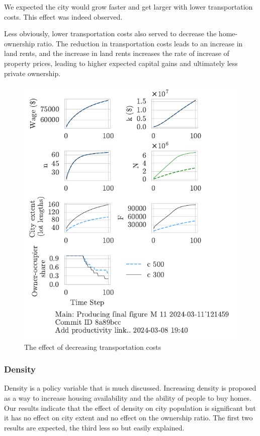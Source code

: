 We expected the city would grow faster and get larger with lower transportation costs. This effect was indeed observed. 

Less obviously, lower transportation costs also served to decrease the home-ownership ratio. The reduction in transportation costs leads to an increase in land rents, and the increase in land rents increases the rate of increase of property prices, leading to higher expected capital gains and ultimately less private ownership. 




\begin{figure}[h!t]
    \centering
    \includegraphics[scale=.8, trim={0 1.4cm 0 0},clip]{fig/c-Main-121459.pdf}
    \caption{The effect of decreasing transportation costs}
    \label{fig:c_ownership_trajectory}
\end{figure}


\newpage
\subsubsection{Density}
Density is a policy variable that is much discussed. Increasing density is proposed as a way to increase housing availability and the ability of people to buy homes. Our results indicate that the effect of density on city population is significant but it has no effect on city extent and no effect on the ownership ratio. The first two results are expected, the third less so but easily explained. 

